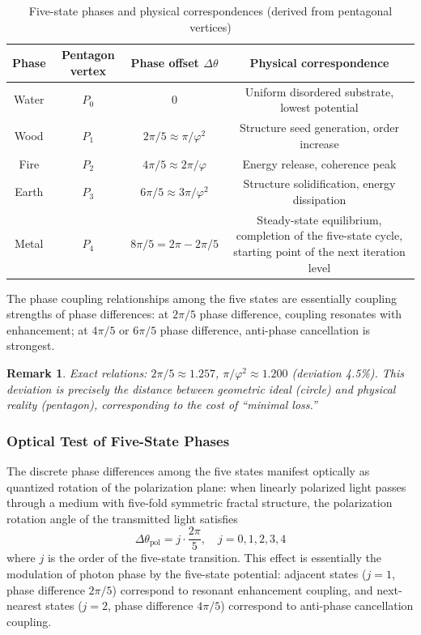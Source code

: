 \documentclass[12pt,a4paper,twocolumn]{article}
\renewcommand{\phi}{\varphi}
\newtheorem{remark}[theorem]{Remark}
\begin{document}
\begin{table}[H]
\centering
\footnotesize
\caption{Five-state phases and physical correspondences (derived from pentagonal vertices)}
\begin{tabular}{c|c|c|c}
\hline
\textbf{Phase} & \textbf{Pentagon vertex} & \textbf{Phase offset} $\Delta\theta$ & \textbf{Physical correspondence} \\
\hline
Water & $P_0$ & 0 & Uniform disordered substrate, lowest potential \\
Wood & $P_1$ & $2\pi/5 \approx \pi/\phi^2$ & Structure seed generation, order increase \\
Fire & $P_2$ & $4\pi/5 \approx 2\pi/\phi$ & Energy release, coherence peak \\
Earth & $P_3$ & $6\pi/5 \approx 3\pi/\phi^2$ & Structure solidification, energy dissipation \\
Metal & $P_4$ & $8\pi/5 = 2\pi - 2\pi/5$ & Steady-state equilibrium, completion of the five-state cycle, starting point of the next iteration level \\
\hline
\end{tabular}
\end{table}

The phase coupling relationships among the five states are essentially coupling strengths of phase differences: at $2\pi/5$ phase difference, coupling resonates with enhancement; at $4\pi/5$ or $6\pi/5$ phase difference, anti-phase cancellation is strongest.

\begin{remark}
Exact relations: $2\pi/5 \approx 1.257$, $\pi/\phi^2 \approx 1.200$ (deviation 4.5\%). This deviation is precisely the distance between geometric ideal (circle) and physical reality (pentagon), corresponding to the cost of ``minimal loss.''
\end{remark}

\subsubsection{Optical Test of Five-State Phases}
\label{subsec:optical_test}
The discrete phase differences among the five states manifest optically as quantized rotation of the polarization plane: when linearly polarized light passes through a medium with five-fold symmetric fractal structure, the polarization rotation angle of the transmitted light satisfies
\begin{equation}
\Delta \theta_{\text{pol}} = j \cdot \frac{2\pi}{5}, \quad j=0,1,2,3,4
\end{equation}
where $j$ is the order of the five-state transition. This effect is essentially the modulation of photon phase by the five-state potential: adjacent states ($j=1$, phase difference $2\pi/5$) correspond to resonant enhancement coupling, and next-nearest states ($j=2$, phase difference $4\pi/5$) correspond to anti-phase cancellation coupling.
\end{document}
